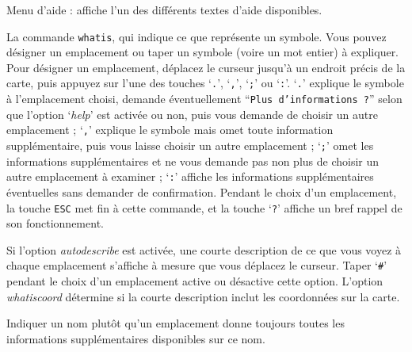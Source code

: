 \documentclass[titlepage]{article}
\begin{document}
\begin{description}[font=\mdseries\ttfamily]
\item[?]
Menu d'aide : affiche l'un des différents textes d'aide disponibles.
\item[/]
La commande \texttt{whatis}, qui
indique ce que représente un symbole.  Vous pouvez désigner un emplacement
ou taper un symbole (voire un mot entier) à expliquer.
Pour désigner un emplacement, déplacez le curseur jusqu'à un endroit précis
de la carte, puis appuyez sur l'une des touches `\texttt{.}', `\texttt{,}', `\texttt{;}'
ou `\texttt{:}'.  `\texttt{.}' explique le symbole à l'emplacement choisi,
demande éventuellement ``\texttt{Plus d'informations ?}'' selon que l'option
`\textit{help}'
est activée ou non, puis vous demande de choisir un autre emplacement ;
`\texttt{,}' explique le symbole mais omet toute information
supplémentaire, puis vous laisse choisir un autre emplacement ;
`\texttt{;}' omet les informations supplémentaires et ne vous demande pas
non plus de choisir un autre emplacement à examiner ; `\texttt{:}' affiche les
informations supplémentaires éventuelles sans demander de confirmation.  Pendant le choix d'un emplacement,
la touche \texttt{ESC} met fin à cette commande, et la touche `\texttt{?}'
affiche un bref rappel de son fonctionnement.

Si l'option
\textit{autodescribe}
est activée, une courte description de ce que vous voyez à chaque emplacement
s'affiche à mesure que vous déplacez le curseur.  Taper `\texttt{\#}' pendant le choix d'un emplacement
active ou désactive cette option.
L'option
\textit{whatis\textunderscore coord}
détermine si la courte description inclut les coordonnées sur la carte.

Indiquer un nom plutôt qu'un emplacement
donne toujours toutes les informations supplémentaires disponibles sur ce nom.


\end{description}
\end{document}
